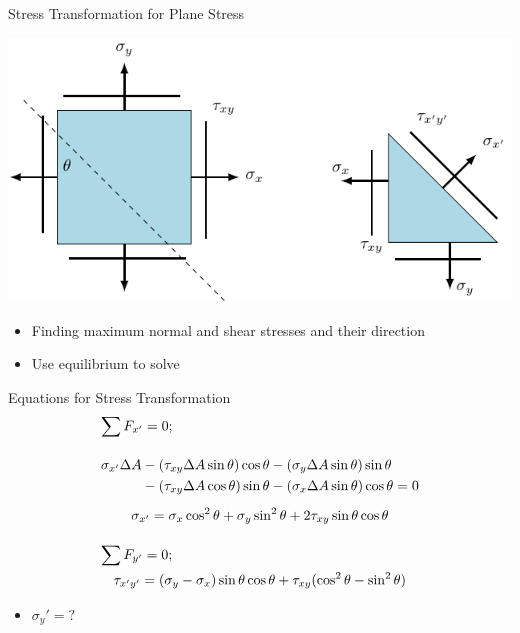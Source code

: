 \documentclass[10pt, svgnames]{beamer}
\begin{document}
\begin{frame}[label={sec:org35b0254}]{Stress Transformation for Plane Stress}
\begin{center}
\includegraphics[width=.9\linewidth]{pictures/stress-trans.pdf}
\end{center}

\begin{itemize}
\item Finding maximum normal and shear stresses and their direction

\item Use equilibrium to solve
\end{itemize}
\end{frame}

\begin{frame}[label={sec:orgec395b6}]{Equations for Stress Transformation}
\begin{gather*}
  \sum F_{x'}  = 0; \hfill \\[1em]
  \begin{split}
    \sigma_{x'}\Delta A &- (\tau_{xy}\Delta A\sin \theta )\cos \theta  - (\sigma_y\Delta A\sin \theta )\sin \theta  \\
    &- (\tau_{xy}\Delta A\cos \theta )\sin \theta  - (\sigma_x\Delta A\sin \theta )\cos \theta  = 0
  \end{split} \nonumber \\[0.5em]
  \sigma_{x'} = \sigma_x\cos^2\theta  + \sigma_y\sin^2\theta  + 2\tau_{xy}\sin \theta \cos \theta  \\[1em]
  \sum F_{y'}  = 0; \hfill \\ 
  \tau_{x'y'} = (\sigma_y - \sigma_x)\sin \theta \cos \theta  + \tau_{xy}(\cos^2\theta  - \sin ^2\theta ) \\ 
\end{gather*}

\begin{itemize}
\item \(\sigma_y' = ?\)
\end{itemize}
\end{frame}
\end{document}

